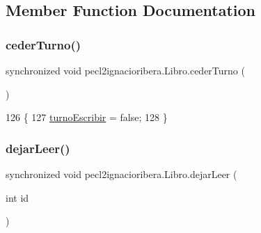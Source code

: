 \subsection{Member Function Documentation}
\mbox{\label{classpecl2ignacioribera_1_1_libro_a78cc01e6cefa7dc833706d59550a4624}} 
\subsubsection{\texorpdfstring{ceder\+Turno()}{cederTurno()}}
{\footnotesize\ttfamily synchronized void pecl2ignacioribera.\+Libro.\+ceder\+Turno (\begin{DoxyParamCaption}{ }\end{DoxyParamCaption})\hspace{0.3cm}{\ttfamily [inline]}}


\begin{DoxyCode}
126     \{
127         \mbox{\hyperlink{classpecl2ignacioribera_1_1_libro_a34d076d438d7b6309b4b499a94d52277}{turnoEscribir}} = \textcolor{keyword}{false};
128     \}
\end{DoxyCode}
\mbox{\label{classpecl2ignacioribera_1_1_libro_abd96718ab4e489e84f69dc24a7229f18}} 
\subsubsection{\texorpdfstring{dejar\+Leer()}{dejarLeer()}}
{\footnotesize\ttfamily synchronized void pecl2ignacioribera.\+Libro.\+dejar\+Leer (\begin{DoxyParamCaption}\item[{int}]{id }\end{DoxyParamCaption})\hspace{0.3cm}{\ttfamily [inline]}}


